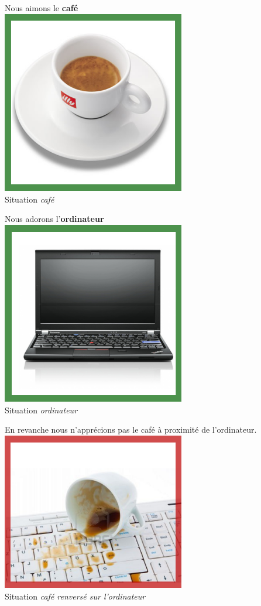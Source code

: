 \begin{minipage}[c]{0.5\textwidth}
\centering
Nous aimons le \textbf{café} \\ 
\includegraphics[width=0.6\textwidth]{files/conclusion/espresso} \\
Situation \emph{café}
\end{minipage}
\begin{minipage}[c]{0.5\textwidth}
\centering
Nous adorons l'\textbf{ordinateur} \\ 
\includegraphics[width=0.6\textwidth]{files/conclusion/ordi} \\
Situation \emph{ordinateur}
\end{minipage}

\begin{center}
En revanche nous n'apprécions pas le café à proximité de l'ordinateur.
\includegraphics[width=0.6\textwidth]{files/conclusion/cafe_renverse} \\
Situation \emph{café renversé sur l'ordinateur}
\end{center}

